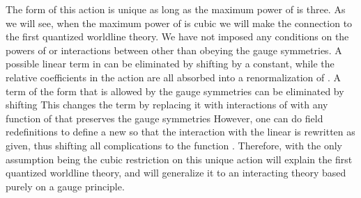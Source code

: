 \documentclass[a4paper,12pt]{article}
\begin{document}
The form of this action is unique as long as the maximum power of \coordHE{} is three. As we will see, when the maximum power of \coordHE{} is
cubic we will make the connection to the first quantized worldline theory.
We have not imposed any conditions on the powers of \myHighlight{$\Phi $}\coordHE{} or interactions
between \coordHE{} other than obeying the gauge symmetries. A
possible linear term in \coordHE{} can be eliminated by shifting \coordHE{} by a constant, while the relative coefficients in the action
are all absorbed into a renormalization of \coordHE{}. A term of
the form \coordHE{} that is allowed by the gauge symmetries can be
eliminated by shifting \coordHE{} This changes the term \coordHE{} by replacing it with
interactions of \coordHE{} with any function of \myHighlight{$\bar{\Phi},\Phi $}\coordHE{} that
preserves the gauge symmetries\coordHE{} However, one can do field redefinitions to
define a new \myHighlight{$\Phi $}\coordHE{} so that the interaction with the linear \coordHE{}
is rewritten as given, thus shifting all complications to the function \coordHE{}. Therefore, with the only
assumption being the cubic restriction on \coordHE{} this unique action
will explain the first quantized worldline theory, and will generalize it to
an interacting theory based purely on a gauge principle.
\end{document}
